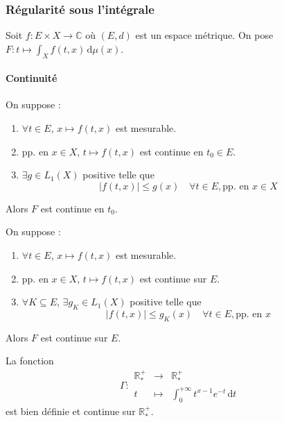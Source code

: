 	\subsubsection{Régularité sous l'intégrale}


	Soit $f : E \times X \rightarrow \mathbb{C}$ où $(E, d)$ est un espace métrique. On pose $F : t \mapsto \int_X f(t, x) \, \mathrm{d}\mu(x)$.

	\paragraph{Continuité}

	\begin{theorem}
		On suppose :
		\begin{enumerate}[label=(\roman*)]
			\item $\forall t \in E$, $x \mapsto f(t,x)$ est mesurable.
			\item pp. en $x \in X$, $t \mapsto f(t,x)$ est continue en $t_0 \in E$.
			\item $\exists g \in L_1(X)$ positive telle que
			\[ |f(t,x)| \leq g(x) \quad \forall t \in E, \text{pp. en } x \in X \]
		\end{enumerate}
		Alors $F$ est continue en $t_0$.
	\end{theorem}

	\begin{corollary}
		On suppose :
		\begin{enumerate}[label=(\roman*)]
			\item $\forall t \in E$, $x \mapsto f(t,x)$ est mesurable.
			\item pp. en $x \in X$, $t \mapsto f(t,x)$ est continue sur $E$.
			\item $\forall K \subseteq E, \, \exists g_K \in L_1(X)$ positive telle que
			\[ |f(t,x)| \leq g_K(x) \quad \forall t \in E, \text{pp. en } x \]
		\end{enumerate}
		Alors $F$ est continue sur $E$.
	\end{corollary}


	\begin{example}
		\label{234-3}
		La fonction
		\[ \Gamma :
		\begin{array}{ccc}
			\mathbb{R}^+_* &\rightarrow& \mathbb{R}^+_* \\
			t &\mapsto& \int_{0}^{+\infty} t^{x-1} e^{-t} \, \mathrm{d}t
		\end{array}
		\]
		est bien définie et continue sur $\mathbb{R}^+_*$.
	\end{example}

